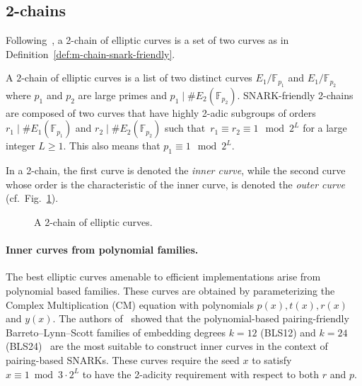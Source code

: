 \documentclass[journal=tches,spthm]{iacrtrans}
\newcommand{\F}{\ensuremath{\mathbb F}}
\begin{document}
\subsection{2-chains}
\label{2-chains}
Following~\cite{EC:HouGui22}, a 2-chain of elliptic curves is a
set of two curves as in Definition~\ref{def:m-chain-snark-friendly}.
%
\begin{definition}
  A $2$-chain of elliptic curves is a list of two distinct curves
    $E_1/\F_{p_1}$ and $E_1/\F_{p_2}$ where $p_1$ and $p_2$ are large primes
    and $p_1 \mid \# E_2(\F_{p_2})$.  SNARK-friendly 2-chains are composed of
    two curves that have highly 2-adic subgroups of orders $r_1 \mid \#
    E_1(\F_{p_1})$ and $r_2 \mid \# E_2(\F_{p_2})$ such that~$r_1 \equiv r_2
    \equiv 1 \mod 2^L$ for a large integer $L \geq 1$. This also means that
    $p_1 \equiv 1 \mod 2^L$.
    \label{def:m-chain-snark-friendly}
\end{definition}
%
In a 2-chain, the first curve is denoted the \textit{inner curve}, while the
second curve whose order is the characteristic of the inner curve, is denoted
the \textit{outer curve} (cf.~Fig.~\ref{figure:EC-chain}).
%
\begin{figure}[htb]
  \centering
  {}
\caption{A 2-chain of elliptic curves.}
  \label{figure:EC-chain}
\end{figure}
%
\paragraph{Inner curves from polynomial families.}
The best elliptic curves amenable to efficient
implementations arise from polynomial based families. These curves are obtained
by parameterizing the Complex Multiplication (CM) equation with polynomials $p(x), t(x), r(x)$ and
$y(x)$.  The authors of~\cite{EC:HouGui22} showed that the polynomial-based
pairing-friendly Barreto--Lynn--Scott families of embedding degrees $k=12$
(BLS12) and $k=24$ (BLS24)~\cite{SCN:BarLynSco02} are the most
suitable to construct inner curves in the context of pairing-based SNARKs. These curves
require the seed $x$ to satisfy $x \equiv 1 \bmod 3\cdot 2^{L}$
to have the 2-adicity requirement with respect to both $r$ and $p$.
\end{document}
